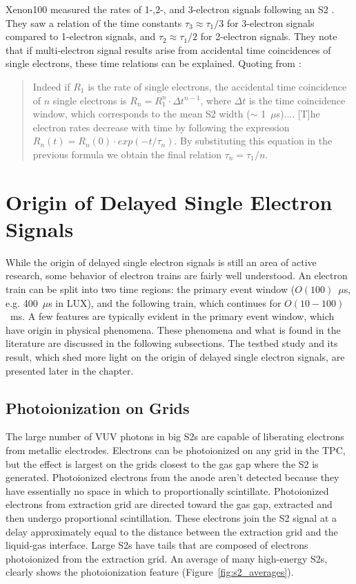Xenon100 measured the rates of 1-,2-, and 3-electron signals following an S2 \cite{Aprile2014}. They saw a relation of the time constants $\tau_{3} \approx \tau_{1}/3$ for 3-electron signals compared to 1-electron signals, and $\tau_{2} \approx \tau_{1}/2$ for 2-electron signals. They note that if multi-electron signal results arise from accidental time coincidences of single electrons, these time relations can be explained. Quoting from \cite{Aprile2014} :

\begin{quote}
Indeed if $R_{1}$ is the rate of single electrons, the accidental time coincidence of $n$ single electrons is $R_{n} = R_{1}^{n}\cdot \Delta t^{n-1}$, where $\Delta t$ is the time coincidence window, which
corresponds to the mean S2 width ($\sim$ 1~$\mu$s).... [T]he electron rates decrease with time by following the expression $R_{n}(t) = R_{n}(0) \cdot exp(- t /  \tau_{n})$. By substituting this equation in the previous formula we obtain the final relation $\tau_{n} =\tau_{1}/n$. 
\end{quote}

\section{Origin of Delayed Single Electron Signals}
While the origin of delayed single electron signals is still an area of active research, some behavior of electron trains are fairly well understood. An electron train can be split into two time regions: the primary event window ($O(100)$~$\mu$s, e.g. 400~$\mu$s in \ac{LUX}), and the following train, which continues for $O(10-100)$~ms. A few features are typically evident in the primary event window, which have origin in physical phenomena. These phenomena and what is found in the literature are discussed in the following subsections. The testbed study and its result, which shed more light on the origin of delayed single electron signals, are presented later in the chapter. 

\subsection{Photoionization on Grids} 
The large number of \ac{VUV} photons in big S2s are capable of liberating electrons from metallic electrodes. Electrons can be photoionized on any grid in the \ac{TPC}, but the effect is largest on the grids closest to the gas gap where the S2 is generated. Photoionized electrons from the anode aren't detected because they have essentially no space in which to proportionally scintillate. Photoionized electrons from extraction grid are directed toward the gas gap, extracted and then undergo proportional scintillation. These electrons join the S2 signal at a delay approximately equal to the distance between the extraction grid and the liquid-gas interface. Large S2s have tails that are composed of electrons photoionized from the extraction grid. An average of many high-energy S2s, clearly shows the photoionization feature (Figure~\ref{fig:s2_averages}). 


